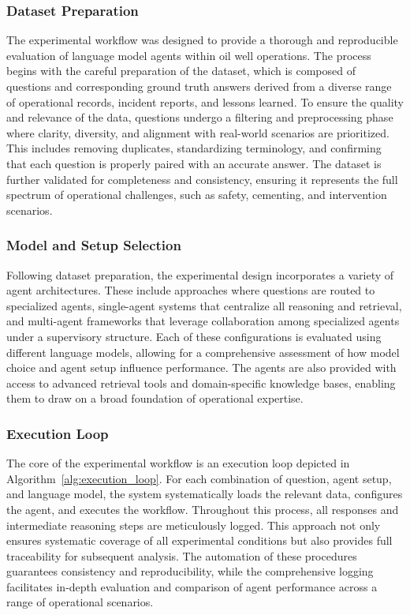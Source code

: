             \subsubsection{Dataset Preparation}

                The experimental workflow was designed to provide a thorough and reproducible evaluation of language model agents within oil well operations. 
                The process begins with the careful preparation of the dataset, which is composed of questions and corresponding ground truth answers derived from a diverse range of operational records, incident reports, and lessons learned. To ensure the quality and relevance of the data, questions undergo a filtering and preprocessing phase where clarity, diversity, and alignment with real-world scenarios are prioritized. 
                This includes removing duplicates, standardizing terminology, and confirming that each question is properly paired with an accurate answer. 
                The dataset is further validated for completeness and consistency, ensuring it represents the full spectrum of operational challenges, such as safety, cementing, and intervention scenarios.

            \subsubsection{Model and Setup Selection}

                Following dataset preparation, the experimental design incorporates a variety of agent architectures.
                These include approaches where questions are routed to specialized agents, single-agent systems that centralize all reasoning and retrieval, and multi-agent frameworks that leverage collaboration among specialized agents under a supervisory structure. Each of these configurations is evaluated using different language models, allowing for a comprehensive assessment of how model choice and agent setup influence performance.
                The agents are also provided with access to advanced retrieval tools and domain-specific knowledge bases, enabling them to draw on a broad foundation of operational expertise.

            \subsubsection{Execution Loop}

                The core of the experimental workflow is an execution loop depicted in Algorithm~\ref{alg:execution_loop}. 
                For each combination of question, agent setup, and language model, the system systematically loads the relevant data, configures the agent, and executes the workflow. 
                Throughout this process, all responses and intermediate reasoning steps are meticulously logged. 
                This approach not only ensures systematic coverage of all experimental conditions but also provides full traceability for subsequent analysis. 
                The automation of these procedures guarantees consistency and reproducibility, while the comprehensive logging facilitates in-depth evaluation and comparison of agent performance across a range of operational scenarios.

